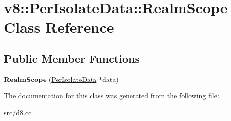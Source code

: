 \hypertarget{classv8_1_1_per_isolate_data_1_1_realm_scope}{}\section{v8\+:\+:Per\+Isolate\+Data\+:\+:Realm\+Scope Class Reference}
\label{classv8_1_1_per_isolate_data_1_1_realm_scope}
\subsection*{Public Member Functions}
\begin{DoxyCompactItemize}
\item 
\hypertarget{classv8_1_1_per_isolate_data_1_1_realm_scope_a5779e979dff507151ee9340e6a8047d5}{}{\bfseries Realm\+Scope} (\hyperlink{classv8_1_1_per_isolate_data}{Per\+Isolate\+Data} $\ast$data)\label{classv8_1_1_per_isolate_data_1_1_realm_scope_a5779e979dff507151ee9340e6a8047d5}

\end{DoxyCompactItemize}


The documentation for this class was generated from the following file\+:\begin{DoxyCompactItemize}
\item 
src/d8.\+cc\end{DoxyCompactItemize}

